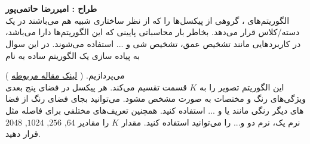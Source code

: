 \documentclass[a4paper]{article}
\begin{document}
\section{}
\textbf{طراح :‌ امیررضا حاتمی‌پور}
\vspace{0.5cm}
\\
الگوریتم‌های
 ، 
گروهی از پیکسل‌ها را که از نظر ساختاری شبیه هم می‌باشند در یک دسته/کلاس قرار می‌دهد. بخاطر بار محاسباتی پایینی که این الگوریتم‌ها دارا می‌باشد، در کاربردهایی مانند تشخیص عمق، تشخیص شی و ... استفاده می‌شوند. در این سوال به پیاده سازی یک الگوریتم ساده 
 به نام
 
 می‌پردازیم.
 (
 \href{http://infoscience.epfl.ch/record/177415/files/Superpixel_PAMI2011-2.pdf}{لینک مقاله مربوطه}
 )
\\
این الگوریتم تصویر را به $ K $ قسمت تقسیم می‌کند. هر پیکسل در فضای پنج بعدی ویژگی‌های رنگ و مختصات به صورت
مشخص مشود. 
می‌توانید بجای فضای رنگ
  از فضا های دیگر رنگی مانند
    یا
    و ... استفاده کنید. همچنین تعریف‌های مختلفی برای فاصله مثل نرم یک، نرم دو و... را می‌توانید استفاده کنید. مقدار $ K $  را مقادیر 
    $ 64 $, $ 256 $, $ 1024 $, $ 2048 $
 قرار دهید. 
\end{document}
